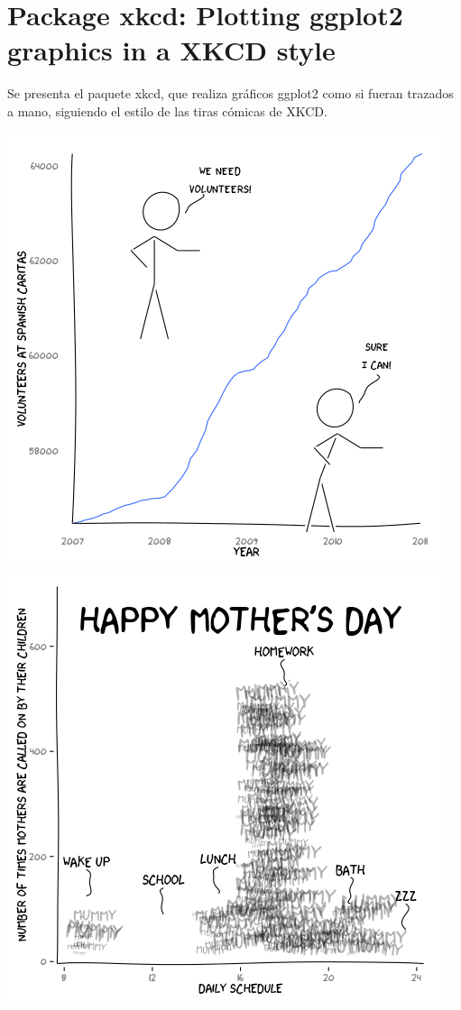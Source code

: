 \chapter{Package xkcd: Plotting ggplot2 graphics in a XKCD style}




Se presenta el paquete xkcd, que realiza gráficos ggplot2 como si fueran trazados a mano, siguiendo el estilo de las tiras cómicas de XKCD.

 \bigskip \begin{center} \includegraphics[width=.33\textwidth]{Logos/caritas.png} \includegraphics[width=.33\textwidth]{Logos/mothersday.png} \end{center}

%

%
